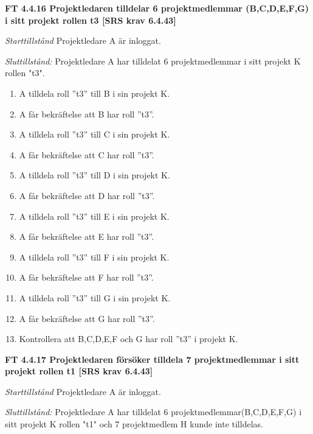 \documentclass[a4paper]{article}
\begin{document}
\textbf{FT 4.4.16 Projektledaren tilldelar 6 projektmedlemmar (B,C,D,E,F,G) i sitt projekt rollen t3 [SRS krav 6.4.43]}

\emph{Starttillstånd} Projektledare A är inloggat.

\emph{Sluttillstånd:} Projektledare A  har tilldelat 6 projektmedlemmar i sitt projekt K rollen "t3".

\begin{enumerate}
\item A tilldela roll ”t3” till B i sin projekt K. 
\item A får bekräftelse att B har roll ”t3”.
\item A tilldela roll ”t3” till C i sin projekt K. 
\item A får bekräftelse att C har roll ”t3”.
\item A tilldela roll ”t3” till D i sin projekt K. 
\item A får bekräftelse att D har roll ”t3”.
\item A tilldela roll ”t3” till E i sin projekt K. 
\item A får bekräftelse att E har roll ”t3”.
\item A tilldela roll ”t3” till F i sin projekt K. 
\item A får bekräftelse att F har roll ”t3”.
\item A tilldela roll ”t3” till G i sin projekt K. 
\item A får bekräftelse att G har roll ”t3”.
\item Kontrollera att B,C,D,E,F och G har roll ”t3” i projekt K.
\end{enumerate}

\textbf{FT 4.4.17 Projektledaren försöker tilldela 7 projektmedlemmar i sitt projekt rollen t1 [SRS krav 6.4.43]}

\emph{Starttillstånd} Projektledare A är inloggat.

\emph{Sluttillstånd:} Projektledare A  har tilldelat 6  projektmedlemmar(B,C,D,E,F,G) i sitt projekt K  rollen "t1" och 7 projektmedlem H kunde inte tilldelas.
\end{document}
